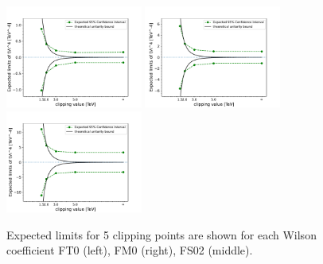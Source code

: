 \begin{figure}[ht]
    \centering
    \includegraphics[width=0.40\textwidth]{figures/aQGC/ClippedFT0CI.pdf}
    	\includegraphics[width=0.40\textwidth]{figures/aQGC/ClippedFM0CI.pdf}
    	\includegraphics[width=0.40\textwidth]{figures/aQGC/ClippedFS02CI.pdf}
        \caption{Expected limits for 5 clipping points are shown for each Wilson coefficient FT0 (left), FM0 (right), FS02 (middle).}
        \label{fig:aQGClimits}
\end{figure}


